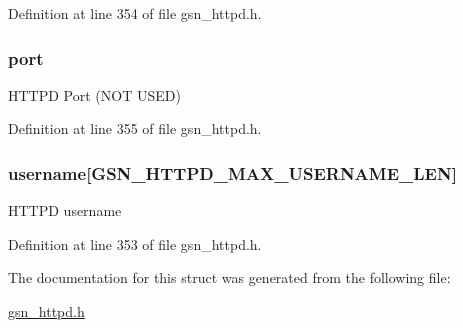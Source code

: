 Definition at line 354 of file gsn\_\-httpd.h.

\hypertarget{a00246_a126a61701dc53e71d74b8e1b50c01ce3}{
\subsubsection[{port}]{ {\bf port}}}
\label{a00246_a126a61701dc53e71d74b8e1b50c01ce3}
HTTPD Port (NOT USED) 

Definition at line 355 of file gsn\_\-httpd.h.

\hypertarget{a00246_a387509f70bf5ba8b2f0d1435e44d4b05}{
\subsubsection[{username}]{ {\bf username}\mbox{[}GSN\_\-HTTPD\_\-MAX\_\-USERNAME\_\-LEN\mbox{]}}}
\label{a00246_a387509f70bf5ba8b2f0d1435e44d4b05}
HTTPD username 

Definition at line 353 of file gsn\_\-httpd.h.



The documentation for this struct was generated from the following file:\begin{DoxyCompactItemize}
\item 
\hyperlink{a00508}{gsn\_\-httpd.h}\end{DoxyCompactItemize}
